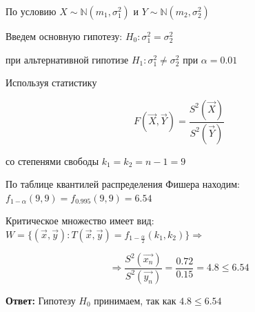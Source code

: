 \documentclass[12pt, a4paper]{report}
\begin{document}
	\vspace{0.3cm}По условию $X \sim  \mathbb{N}(m_1, \sigma^2_1)$ и $Y \sim  \mathbb{N}(m_2, \sigma^2_2)$
	
	\vspace{0.3cm}Введем основную гипотезу: $H_0: \sigma^2_1 = \sigma^2_2$
	
	\vspace{0.3cm}при альтернативной гипотизе $H_1: \sigma^2_1 \neq \sigma^2_2$ при $\alpha = 0.01$
	
	\vspace{0.3cm}Используя статистику
	
	\begin{equation*}
	F(\vec{X}, \vec{Y}) = \frac{S^2(\vec{X})}{S^2(\vec{Y})}
	\end{equation*}
	
	\vspace{0.3cm}со степенями свободы $k_1 = k_2 = n - 1 = 9$
	
	\vspace{0.3cm}  По таблице квантилей распределения Фишера находим: $f_{1-\alpha}(9,9) = f_{0.995}(9,9) = 6.54$
	
	\vspace{0.3cm} Критическое множество имеет вид: $W = \{  (\vec{x}, \vec{y}): T(\vec{x}, \vec{y}) = f_{1 - \frac{\alpha}{2}}(k_1, k_2)  \} \Rightarrow$

	
	\begin{equation*}
	\Rightarrow \frac{S^2(\vec{x_n})}{S^2(\vec{y_n})} = \frac{0.72}{0.15} =  4.8 \le 6.54
	\end{equation*}
	
	\vspace{0.5cm}
	\textbf{Ответ:}
	Гипотезу $H_0$ принимаем, так как $4.8 \le 6.54$
	
	\newpage
	
\end{document}
